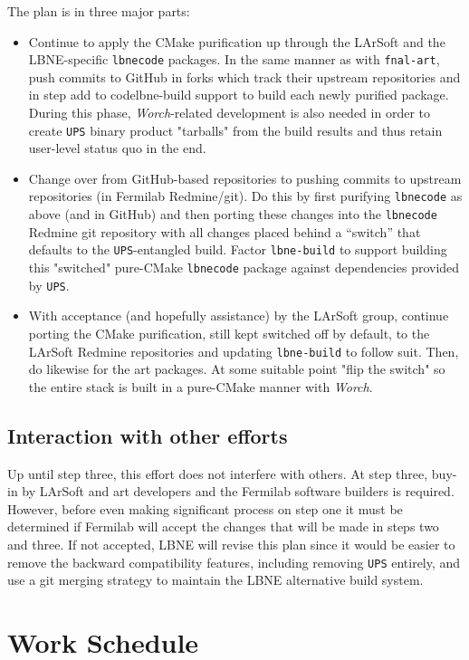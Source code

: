 \documentclass[usletter]{article}
\newcommand{\code}[1]{\texttt{#1}}
\newcommand{\worch}{\textit{Worch}\xspace}
\newcommand{\ups}{\code{UPS}\xspace}
\newcommand{\art}{art\xspace}
\newcommand{\larsoft}{LArSoft\xspace}
\newcommand{\lbnecode}{\code{lbnecode}\xspace}
\begin{document}
The plan is in three major parts:
\begin{itemize}
	\item Continue to apply the CMake purification up through the LArSoft and the LBNE-specific
    \lbnecode packages. In the same manner as with \code{fnal-art}, push
    commits to GitHub in forks which track their upstream repositories
    and in step add to code{lbne-build} support to build each newly purified
    package. During this phase, \worch-related development is also needed
    in order to create \ups binary product "tarballs" from the build
    results and thus retain user-level status quo in the end.
	\item Change over from GitHub-based repositories to pushing commits to
    upstream repositories (in Fermilab Redmine/git). Do this by first purifying 
    \lbnecode as above (and in GitHub) and then porting these changes into the
    \lbnecode Redmine git repository with all changes placed behind a
    ``switch'' that defaults to the \ups-entangled build. Factor
    \code{lbne-build} to support building this "switched" pure-CMake
    \lbnecode package against dependencies provided by \ups.
	\item With acceptance (and hopefully assistance) by the LArSoft group,
    continue porting the CMake purification, still kept switched off by
    default, to the LArSoft Redmine repositories and updating
    \code{lbne-build} to follow suit. Then, do likewise for the \art
    packages. At some suitable point "flip the switch" so the entire
    stack is built in a pure-CMake manner with \worch.
\end{itemize}


\subsection{Interaction with other efforts}

Up until step three, this effort does not interfere with others. At step
three, buy-in by \larsoft and \art developers and the Fermilab software
builders is required. However, before even making significant process on
step one it must be determined if Fermilab will accept the changes that
will be made in steps two and three. If not accepted, LBNE will revise
this plan  since it would be 
easier to remove the backward compatibility features, including removing \ups entirely, 
and use a git merging strategy to maintain the LBNE alternative build system.

\section{Work Schedule}
\end{document}
